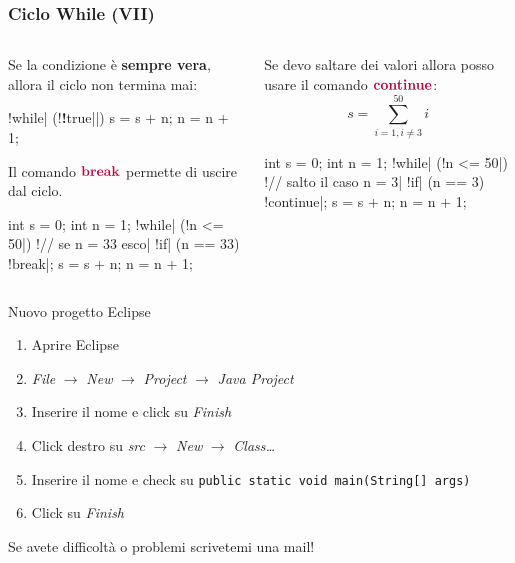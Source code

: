 \begin{frame}[fragile]\frametitle{Ciclo While (VII)}
  \begin{columns}[T]
    \begin{column}[T]{5cm}
      Se la condizione è \textbf{sempre vera}, allora il ciclo non termina mai:
      \begin{JavaCodePlain}[commandchars=\\!|]
	\Word!while| (\Green!\textbf!true||) {
	  s = s + n; 
	  n = n + 1; 
	}
      \end{JavaCodePlain}
      Il comando $\Word{\textbf{break}}$ permette di uscire dal ciclo.
      \begin{JavaCodePlain}[commandchars=\\!|]
	int s = 0;
	int n = 1;
	\Word!while| (\Green!n <= 50|) {
	  \Green!// se n = 33 esco|
	  \Word!if| (n == 33) {
	    \Word!break|;
	  }
	  s = s + n;
	  n = n + 1;
	}
      \end{JavaCodePlain}

    \end{column}
    \begin{column}[T]{5cm}
      Se devo saltare dei valori allora posso usare il comando $\Word{\textbf{continue}}$:
      \[ s = \sum_{i=1, i \neq 3}^{50} i \]
      \begin{JavaCodePlain}[commandchars=\\!|]
	int s = 0;
	int n = 1;
	\Word!while| (\Green!n <= 50|) {
	  \Green!// salto il caso n = 3|
	  \Word!if| (n == 3) {
	    \Word!continue|;
	  }
	  s = s + n;
	  n = n + 1;
	}
      \end{JavaCodePlain}
    \end{column}
  \end{columns}
\end{frame}

\begin{frame}{Nuovo progetto Eclipse}
  \begin{enumerate}
   \item Aprire Eclipse
   \item \emph{File} $\rightarrow$ \emph{New} $\rightarrow$ \emph{Project} $\rightarrow$ \emph{Java Project}
   \item Inserire il nome e click su \emph{Finish}
   \item Click destro su \emph{src} $\rightarrow$ \emph{New} $\rightarrow$ \emph{Class\dots}
   \item Inserire il nome e check su \newline
	  \texttt{public static void main(String[] args)}
   \item Click su \emph{Finish}
  \end{enumerate}
  Se avete difficoltà o problemi scrivetemi una mail!

\end{frame}

